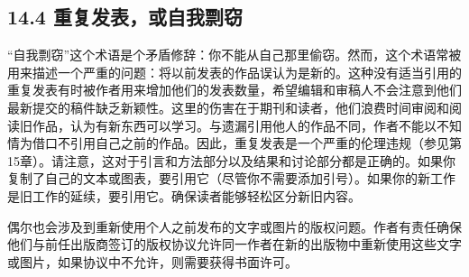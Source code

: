 \subsection*{14.4 重复发表，或自我剽窃}
“自我剽窃”这个术语是个矛盾修辞：你不能从自己那里偷窃。然而，这个术语常被用来描述一个严重的问题：将以前发表的作品误认为是新的。这种没有适当引用的重复发表有时被作者用来增加他们的发表数量，希望编辑和审稿人不会注意到他们最新提交的稿件缺乏新颖性。这里的伤害在于期刊和读者，他们浪费时间审阅和阅读旧作品，认为有新东西可以学习。与遗漏引用他人的作品不同，作者不能以不知情为借口不引用自己之前的作品。因此，重复发表是一个严重的伦理违规（参见第15章）。请注意，这对于引言和方法部分以及结果和讨论部分都是正确的。如果你复制了自己的文本或图表，要引用它（尽管你不需要添加引号）。如果你的新工作是旧工作的延续，要引用它。确保读者能够轻松区分新旧内容。

偶尔也会涉及到重新使用个人之前发布的文字或图片的版权问题。作者有责任确保他们与前任出版商签订的版权协议允许同一作者在新的出版物中重新使用这些文字或图片，如果协议中不允许，则需要获得书面许可。

